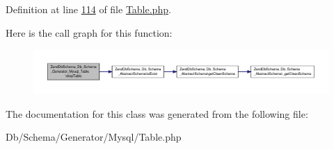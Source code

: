 Definition at line \hyperlink{Generator_2Mysql_2Table_8php_source_l00114}{114} of file \hyperlink{Generator_2Mysql_2Table_8php_source}{Table.\-php}.



Here is the call graph for this function\-:\nopagebreak
\begin{figure}[H]
\begin{center}
\leavevmode
\includegraphics[width=350pt]{classZendDbSchema__Db__Schema__Generator__Mysql__Table_a83d5cec1c67e8961773da5a47d213301_cgraph}
\end{center}
\end{figure}




The documentation for this class was generated from the following file\-:\begin{DoxyCompactItemize}
\item 
Db/\-Schema/\-Generator/\-Mysql/Table.\-php\end{DoxyCompactItemize}
